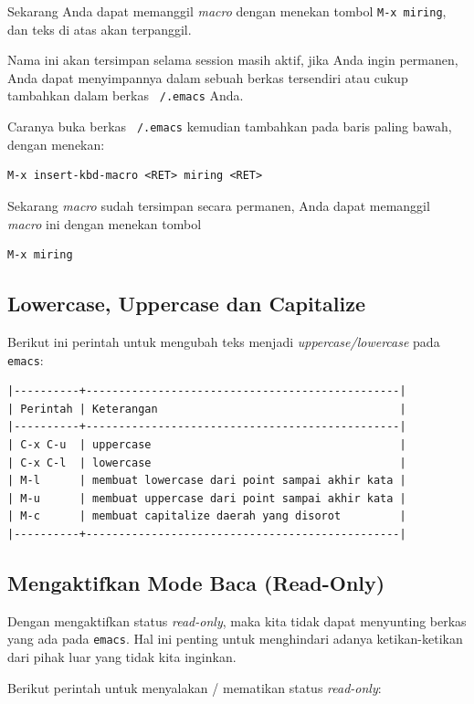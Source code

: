 \documentclass{article}
\begin{document}
Sekarang Anda dapat memanggil \emph{macro} dengan menekan tombol
\texttt{M-x miring}, dan teks di atas akan terpanggil.

Nama ini akan tersimpan selama session masih aktif, jika Anda ingin
permanen, Anda dapat menyimpannya dalam sebuah berkas tersendiri atau
cukup tambahkan dalam berkas \texttt{~/.emacs} Anda.

Caranya buka berkas \texttt{~/.emacs} kemudian tambahkan pada baris
paling bawah, dengan menekan:

\begin{verbatim}
M-x insert-kbd-macro <RET> miring <RET>
\end{verbatim}

Sekarang \emph{macro} sudah tersimpan secara permanen, Anda dapat
memanggil \emph{macro} ini dengan menekan tombol

\begin{verbatim}
M-x miring
\end{verbatim}

\subsection{Lowercase, Uppercase dan Capitalize}
Berikut ini perintah untuk mengubah teks menjadi \emph{uppercase/lowercase}
pada \verb=emacs=:

\begin{verbatim}
|----------+------------------------------------------------|
| Perintah | Keterangan                                     |
|----------+------------------------------------------------|
| C-x C-u  | uppercase                                      |
| C-x C-l  | lowercase                                      |
| M-l      | membuat lowercase dari point sampai akhir kata |
| M-u      | membuat uppercase dari point sampai akhir kata |
| M-c      | membuat capitalize daerah yang disorot         |
|----------+------------------------------------------------|
\end{verbatim}

\subsection{Mengaktifkan Mode Baca (Read-Only)}
Dengan mengaktifkan status \emph{read-only}, maka kita tidak dapat menyunting
berkas yang ada pada \verb=emacs=. Hal ini penting untuk menghindari adanya
ketikan-ketikan dari pihak luar yang tidak kita inginkan.

Berikut perintah untuk menyalakan / mematikan status \emph{read-only}:
\end{document}
